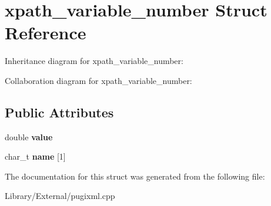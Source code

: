 \hypertarget{structxpath__variable__number}{}\section{xpath\+\_\+variable\+\_\+number Struct Reference}
\label{structxpath__variable__number}


Inheritance diagram for xpath\+\_\+variable\+\_\+number\+:


Collaboration diagram for xpath\+\_\+variable\+\_\+number\+:
\subsection*{Public Attributes}
\begin{DoxyCompactItemize}
\item 
\hypertarget{structxpath__variable__number_a49949397348e7c941d88a694ec5c8e57}{}double {\bfseries value}\label{structxpath__variable__number_a49949397348e7c941d88a694ec5c8e57}

\item 
\hypertarget{structxpath__variable__number_a2bf4163dab1a8e233d45677fee987f0f}{}char\+\_\+t {\bfseries name} \mbox{[}1\mbox{]}\label{structxpath__variable__number_a2bf4163dab1a8e233d45677fee987f0f}

\end{DoxyCompactItemize}


The documentation for this struct was generated from the following file\+:\begin{DoxyCompactItemize}
\item 
Library/\+External/pugixml.\+cpp\end{DoxyCompactItemize}
